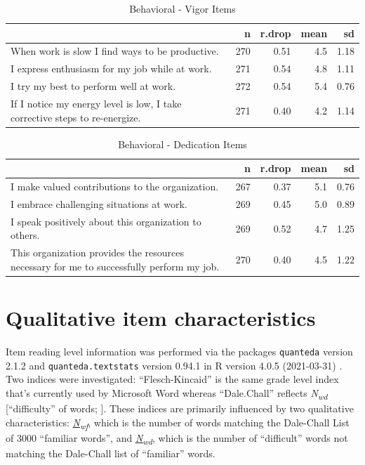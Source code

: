 \documentclass[
]{book}
\begin{document}
\begin{table}

\caption{\label{tab:rdrop14}Behavioral - Vigor Items}
\centering
\begin{tabular}[t]{l|r|r|r|r}
\hline
  & n & r.drop & mean & sd\\
\hline
When work is slow I find ways to be productive. & 270 & 0.51 & 4.5 & 1.18\\
\hline
I express enthusiasm for my job while at work. & 271 & 0.54 & 4.8 & 1.11\\
\hline
I try my best to perform well at work. & 272 & 0.54 & 5.4 & 0.76\\
\hline
If I notice my energy level is low, I take corrective steps to re-energize. & 271 & 0.40 & 4.2 & 1.14\\
\hline
\end{tabular}
\end{table}

\begin{table}

\caption{\label{tab:rdrop15}Behavioral - Dedication Items}
\centering
\begin{tabular}[t]{l|r|r|r|r}
\hline
  & n & r.drop & mean & sd\\
\hline
I make valued contributions to the organization. & 267 & 0.37 & 5.1 & 0.76\\
\hline
I embrace challenging situations at work. & 269 & 0.45 & 5.0 & 0.89\\
\hline
I speak positively about this organization to others. & 269 & 0.52 & 4.7 & 1.25\\
\hline
This organization provides the resources necessary for me to successfully perform my job. & 270 & 0.40 & 4.5 & 1.22\\
\hline
\end{tabular}
\end{table}

\hypertarget{qualitative}{%
\chapter{Qualitative item characteristics}\label{qualitative}}

Item reading level information was performed via the packages \texttt{quanteda} version 2.1.2 \citep{R-quanteda} and \texttt{quanteda.textstats} version 0.94.1 \citep{R-quanteda.textstats} in R version 4.0.5 (2021-03-31) \citep{R-base}. Two indices were investigated: ``Flesch-Kincaid'' is the same grade level index that's currently used by Microsoft Word \citep{kincaid_derivation_1975} whereas ``Dale.Chall'' reflects \emph{N\textsubscript{wd}} {[}``difficulty'' of words; \citet{chall_dale_1995}{]}. These indices are primarily influenced by two qualitative characteristics: \href{https://quanteda.io/reference/textstat_readability.html}{\emph{N\textsubscript{wf}}}, which is the number of words matching the Dale-Chall List of 3000 ``familiar words'', and \href{https://quanteda.io/reference/textstat_readability.html}{\emph{N\textsubscript{wd}}}, which is the number of ``difficult'' words not matching the Dale-Chall list of ``familiar'' words.
\end{document}
